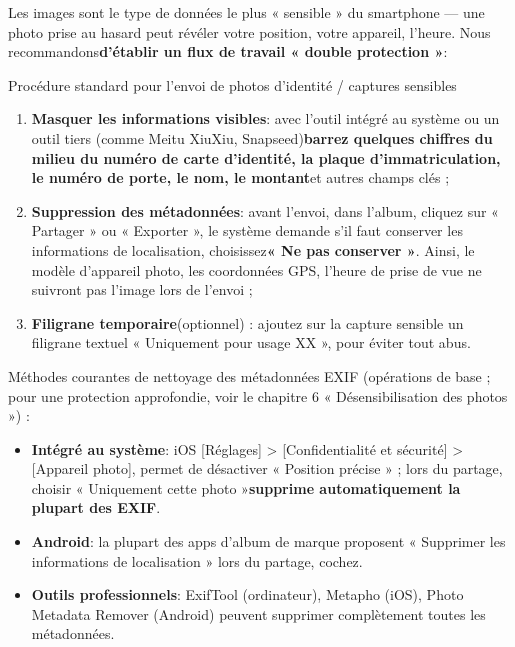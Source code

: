 
Les images sont le type de données le plus « sensible » du smartphone — une photo prise au hasard peut révéler votre position, votre appareil, l'heure. Nous recommandons\textbf{d'établir un flux de travail « double protection »}:

\begin{tcbwarn}{Procédure standard pour l'envoi de photos d'identité / captures sensibles}
\begin{enumerate}
  \item \textbf{Masquer les informations visibles}: avec l'outil intégré au système ou un outil tiers (comme Meitu XiuXiu, Snapseed)\textbf{barrez quelques chiffres du milieu du numéro de carte d'identité, la plaque d'immatriculation, le numéro de porte, le nom, le montant}et autres champs clés ;
  \item \textbf{Suppression des métadonnées}: avant l'envoi, dans l'album, cliquez sur « Partager » ou « Exporter », le système demande s'il faut conserver les informations de localisation, choisissez\textbf{« Ne pas conserver »}. Ainsi, le modèle d'appareil photo, les coordonnées GPS, l'heure de prise de vue ne suivront pas l'image lors de l'envoi ;
  \item \textbf{Filigrane temporaire}(optionnel) : ajoutez sur la capture sensible un filigrane textuel « Uniquement pour usage XX », pour éviter tout abus.
\end{enumerate}

\end{tcbwarn}

Méthodes courantes de nettoyage des métadonnées EXIF (opérations de base ; pour une protection approfondie, voir le chapitre 6 « Désensibilisation des photos ») :

\begin{itemize}
  \item \textbf{Intégré au système}: iOS [Réglages] > [Confidentialité et sécurité] > [Appareil photo], permet de désactiver « Position précise » ; lors du partage, choisir « Uniquement cette photo »\textbf{supprime automatiquement la plupart des EXIF}.
  \item \textbf{Android}: la plupart des apps d'album de marque proposent « Supprimer les informations de localisation » lors du partage, cochez.
  \item \textbf{Outils professionnels}: ExifTool (ordinateur), Metapho (iOS), Photo Metadata Remover (Android) peuvent supprimer complètement toutes les métadonnées.
\end{itemize}

